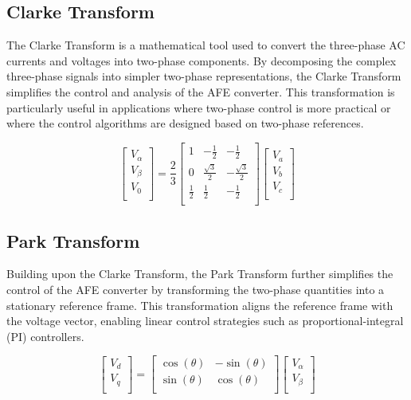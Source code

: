 \subsection{Clarke Transform}
\label{clarke}
The Clarke Transform is a mathematical tool used to convert the three-phase AC
currents and voltages into two-phase components. By decomposing the complex
three-phase signals into simpler two-phase representations, the Clarke
Transform simplifies the control and analysis of the AFE converter. This
transformation is particularly useful in applications where two-phase control
is more practical or where the control algorithms are designed based on
two-phase references.

\[
    \begin{bmatrix}
        V_\alpha \\
        V_\beta  \\
        V_0      \\
    \end{bmatrix}
    = \frac{2}{3}
    \begin{bmatrix}
        1           & -\frac{1}{2}       & -\frac{1}{2}        \\
        0           & \frac{\sqrt{3}}{2} & -\frac{\sqrt{3}}{2} \\
        \frac{1}{2} & \frac{1}{2}        & -\frac{1}{2}        \\
    \end{bmatrix}
    \begin{bmatrix}
        V_a \\
        V_b \\
        V_c \\
    \end{bmatrix}
\]

\subsection{Park Transform}
\label{park}
Building upon the Clarke Transform, the Park Transform further simplifies the
control of the AFE converter by transforming the two-phase quantities into a
stationary reference frame. This transformation aligns the reference frame with
the voltage vector, enabling linear control strategies such as
proportional-integral (PI) controllers.

\[
    \begin{bmatrix}
        V_d \\
        V_q \\
    \end{bmatrix}
    =
    \begin{bmatrix}
        \cos(\theta) & -\sin(\theta) \\
        \sin(\theta) & \cos(\theta)  \\
    \end{bmatrix}
    \begin{bmatrix}
        V_\alpha \\
        V_\beta  \\
    \end{bmatrix}
\]

